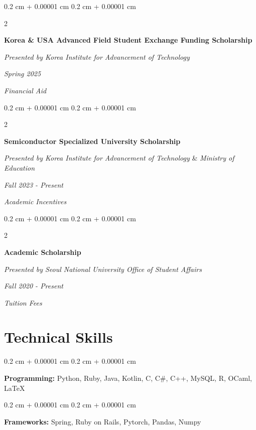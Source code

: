 \documentclass[10pt, letterpaper]{article}
\newenvironment{onecolentry}{
    \begin{adjustwidth}{
        0.2 cm + 0.00001 cm
    }{
        0.2 cm + 0.00001 cm
    }
}{
    \end{adjustwidth}
} %
\newenvironment{twocolentry}[2][]{
    \onecolentry
    \def\secondColumn{#2}
    \setcolumnwidth{\fill, 4.5 cm}
    \begin{paracol}{2}
}{
    \switchcolumn \raggedleft \secondColumn
    \end{paracol}
    \endonecolentry
} %
\begin{document}
        \begin{twocolentry}{
        \textit{Spring 2025}    
            
        \textit{Financial Aid}}
            \textbf{Korea \& USA Advanced Field Student Exchange Funding Scholarship}
            
            \textit{Presented by Korea Institute for Advancement of Technology}
        \end{twocolentry}
    
        \vspace{0.3 cm}

        \begin{twocolentry}{
        \textit{Fall 2023 - Present}    
            
        \textit{Academic Incentives}}
            \textbf{Semiconductor Specialized University Scholarship}
            
            \textit{Presented by Korea Institute for Advancement of Technology} \& \textit{Ministry of Education}
        \end{twocolentry}

        \vspace{0.3 cm}

        \begin{twocolentry}{
        \textit{Fall 2020 - Present}    
            
        \textit{Tuition Fees}}
            \textbf{Academic Scholarship}
            
            \textit{Presented by Seoul National University Office of Student Affairs}
        \end{twocolentry}

    
    \section{Technical Skills}

        \begin{onecolentry}
            \textbf{Programming:} Python, Ruby, Java, Kotlin, C, C\#, C++, MySQL, R, OCaml, LaTeX
        \end{onecolentry}

        \vspace{0.2 cm}

        \begin{onecolentry}
            \textbf{Frameworks:} Spring, Ruby on Rails, Pytorch, Pandas, Numpy
        \end{onecolentry}
\end{document}
